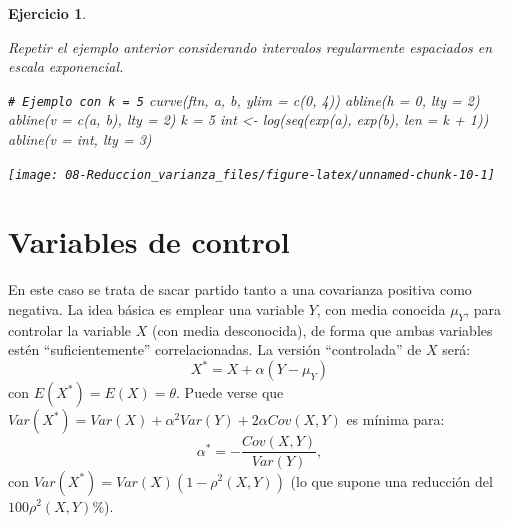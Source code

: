 \documentclass[
  10pt,
]{book}
\newenvironment{Shaded}{\begin{snugshade}}{\end{snugshade}}
\newcommand{\AttributeTok}[1]{\textcolor[rgb]{0.77,0.63,0.00}{#1}}
\newcommand{\CommentTok}[1]{\textcolor[rgb]{0.56,0.35,0.01}{\textit{#1}}}
\newcommand{\DecValTok}[1]{\textcolor[rgb]{0.00,0.00,0.81}{#1}}
\newcommand{\FunctionTok}[1]{\textcolor[rgb]{0.00,0.00,0.00}{#1}}
\newcommand{\NormalTok}[1]{#1}
\newcommand{\OtherTok}[1]{\textcolor[rgb]{0.56,0.35,0.01}{#1}}
\newcommand{\SpecialCharTok}[1]{\textcolor[rgb]{0.00,0.00,0.00}{#1}}
\theoremstyle{break}
\newtheorem{exercise}{Ejercicio}[chapter]
\theoremstyle{nonumberplain}
\renewcommand{\CommentTok}[1]{\textcolor[rgb]{0.41,0.41,0.41}{\texttt{#1}}}
\begin{document}
\begin{exercise}
\protect\hypertarget{exr:integraleb}{}\label{exr:integraleb}

Repetir el ejemplo anterior considerando intervalos regularmente espaciados en escala exponencial.

\begin{Shaded}
\begin{Highlighting}[]
\CommentTok{\# Ejemplo con k = 5}
\FunctionTok{curve}\NormalTok{(ftn, a, b, }\AttributeTok{ylim =} \FunctionTok{c}\NormalTok{(}\DecValTok{0}\NormalTok{, }\DecValTok{4}\NormalTok{))}
\FunctionTok{abline}\NormalTok{(}\AttributeTok{h =} \DecValTok{0}\NormalTok{, }\AttributeTok{lty =} \DecValTok{2}\NormalTok{)}
\FunctionTok{abline}\NormalTok{(}\AttributeTok{v =} \FunctionTok{c}\NormalTok{(a, b), }\AttributeTok{lty =} \DecValTok{2}\NormalTok{)}
\NormalTok{k }\OtherTok{=} \DecValTok{5}
\NormalTok{int }\OtherTok{\textless{}{-}} \FunctionTok{log}\NormalTok{(}\FunctionTok{seq}\NormalTok{(}\FunctionTok{exp}\NormalTok{(a), }\FunctionTok{exp}\NormalTok{(b), }\AttributeTok{len =}\NormalTok{ k }\SpecialCharTok{+} \DecValTok{1}\NormalTok{))}
\FunctionTok{abline}\NormalTok{(}\AttributeTok{v =}\NormalTok{ int, }\AttributeTok{lty =} \DecValTok{3}\NormalTok{)}
\end{Highlighting}
\end{Shaded}

\begin{center}\texttt{[image: 08-Reduccion\_varianza\_files/figure-latex/unnamed-chunk-10-1]} \end{center}

\end{exercise}

\hypertarget{variables-de-control}{%
\section{Variables de control}\label{variables-de-control}}

En este caso se trata de sacar partido tanto a una covarianza
positiva como negativa.
La idea básica es emplear una variable \(Y\), con media conocida
\(\mu_{Y}\), para controlar la variable \(X\) (con media desconocida),
de forma que ambas variables estén ``suficientemente'' correlacionadas.
La versión ``controlada'' de \(X\) será:
\[X^{\ast}=X+\alpha \left(  Y-\mu_{Y}\right)\]
con \(E(X^{\ast})=E(X)=\theta\).
Puede verse que
\(Var(X^{\ast})=Var(X)+\alpha^{2}Var(Y)+2\alpha Cov(X,Y)\)
es mínima para:
\[\alpha^{\ast}=-\frac{Cov(X,Y)}{Var(Y)},\]
con \(Var(X^{\ast}) = Var(X) \left( 1-\rho^{2} \left( X, Y \right) \right)\)
(lo que supone una reducción del \(100\rho^{2}\left( X, Y \right) \%\)).
\end{document}
